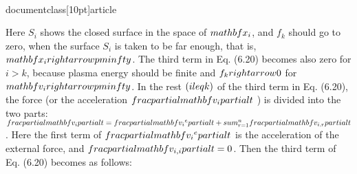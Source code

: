 \\documentclass[10pt]{article}
\begin{document}
{{{{Here $S_{i}$ shows the closed surface in the space of $\\mathbf{x}_{i}$, and $f_{k}$ should go to zero, when the surface $S_{i}$ is taken to be far enough, that is, $\\mathbf{x}_{i} \\rightarrow \\pm \\infty$. The third term in Eq. (6.20) becomes also zero for $i>k$, because plasma energy should be finite and $f_{k} \\rightarrow 0$ for $\\mathbf{v}_{i} \\rightarrow \\pm \\infty$. In the rest $(i \\leq k)$ of the third term in Eq. (6.20), the force (or the acceleration $\\frac{\\partial \\mathbf{v}_{i}}{\\partial t}$ ) is divided into the two parts: $\\frac{\\partial \\mathbf{v}_{i}}{\\partial t}=\\frac{\\partial \\mathbf{v}_{i}{ }^{e}}{\\partial t}+\\sum_{r=1}^{n} \\frac{\\partial \\mathbf{v}_{i, r}}{\\partial t}$. Here the first term of $\\frac{\\partial \\mathbf{v}_{i}{ }^{e}}{\\partial t}$ is the acceleration of the external force, and $\\frac{\\partial \\mathbf{v}_{i, i}}{\\partial t}=0$. Then the third term of Eq. (6.20) becomes as follows:


}}}}
\end{document}
